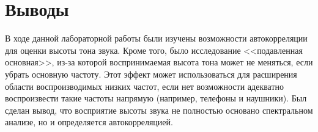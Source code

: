 \documentclass[a4paper, 14pt]{extarticle}
\begin{document}
    \section{Выводы}
    \label{sec:conclusions}

    В ходе данной лабораторной работы были изучены возможности автокорреляции для оценки высоты тона звука. Кроме того,
    было исследование <<подавленная основная>>,  из-за которой воспринимаемая высота тона может не меняться, если убрать
    основную частоту. Этот эффект может использоваться для расширения области воспроизводимых низких частот, если
    нет возможности адекватно воспроизвести такие частоты напрямую (например, телефоны и наушники). Был сделан вывод,
    что восприятие высоты звука не полностью основано спектральном анализе, но и определяется автокорреляцией.
\end{document}
